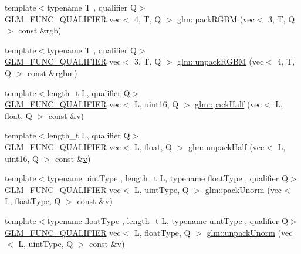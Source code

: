 \begin{DoxyCompactItemize}
\item 
{\footnotesize template$<$typename T , qualifier Q$>$ }\\\mbox{\hyperlink{setup_8hpp_a33fdea6f91c5f834105f7415e2a64407}{G\+L\+M\+\_\+\+F\+U\+N\+C\+\_\+\+Q\+U\+A\+L\+I\+F\+I\+ER}} vec$<$ 4, T, Q $>$ \mbox{\hyperlink{group__gtc__packing_ga0466daf4c90f76cc64b3f105ce727295}{glm\+::pack\+R\+G\+BM}} (vec$<$ 3, T, Q $>$ const \&rgb)
\item 
{\footnotesize template$<$typename T , qualifier Q$>$ }\\\mbox{\hyperlink{setup_8hpp_a33fdea6f91c5f834105f7415e2a64407}{G\+L\+M\+\_\+\+F\+U\+N\+C\+\_\+\+Q\+U\+A\+L\+I\+F\+I\+ER}} vec$<$ 3, T, Q $>$ \mbox{\hyperlink{group__gtc__packing_ga5c1ec97894b05ea21a05aea4f0204a02}{glm\+::unpack\+R\+G\+BM}} (vec$<$ 4, T, Q $>$ const \&rgbm)
\item 
{\footnotesize template$<$length\+\_\+t L, qualifier Q$>$ }\\\mbox{\hyperlink{setup_8hpp_a33fdea6f91c5f834105f7415e2a64407}{G\+L\+M\+\_\+\+F\+U\+N\+C\+\_\+\+Q\+U\+A\+L\+I\+F\+I\+ER}} vec$<$ L, uint16, Q $>$ \mbox{\hyperlink{group__gtc__packing_ga2d8bbce673ebc04831c1fb05c47f5251}{glm\+::pack\+Half}} (vec$<$ L, float, Q $>$ const \&\mbox{\hyperlink{_s_d_l__opengl_8h_a10a82eabcb59d2fcd74acee063775f90}{v}})
\item 
{\footnotesize template$<$length\+\_\+t L, qualifier Q$>$ }\\\mbox{\hyperlink{setup_8hpp_a33fdea6f91c5f834105f7415e2a64407}{G\+L\+M\+\_\+\+F\+U\+N\+C\+\_\+\+Q\+U\+A\+L\+I\+F\+I\+ER}} vec$<$ L, float, Q $>$ \mbox{\hyperlink{group__gtc__packing_ga30d6b2f1806315bcd6047131f547d33b}{glm\+::unpack\+Half}} (vec$<$ L, uint16, Q $>$ const \&\mbox{\hyperlink{_s_d_l__opengl_8h_a10a82eabcb59d2fcd74acee063775f90}{v}})
\item 
{\footnotesize template$<$typename uint\+Type , length\+\_\+t L, typename float\+Type , qualifier Q$>$ }\\\mbox{\hyperlink{setup_8hpp_a33fdea6f91c5f834105f7415e2a64407}{G\+L\+M\+\_\+\+F\+U\+N\+C\+\_\+\+Q\+U\+A\+L\+I\+F\+I\+ER}} vec$<$ L, uint\+Type, Q $>$ \mbox{\hyperlink{group__gtc__packing_gaccd3f27e6ba5163eb7aa9bc8ff96251a}{glm\+::pack\+Unorm}} (vec$<$ L, float\+Type, Q $>$ const \&\mbox{\hyperlink{_s_d_l__opengl_8h_a10a82eabcb59d2fcd74acee063775f90}{v}})
\item 
{\footnotesize template$<$typename float\+Type , length\+\_\+t L, typename uint\+Type , qualifier Q$>$ }\\\mbox{\hyperlink{setup_8hpp_a33fdea6f91c5f834105f7415e2a64407}{G\+L\+M\+\_\+\+F\+U\+N\+C\+\_\+\+Q\+U\+A\+L\+I\+F\+I\+ER}} vec$<$ L, float\+Type, Q $>$ \mbox{\hyperlink{group__gtc__packing_ga3e6ac9178b59f0b1b2f7599f2183eb7f}{glm\+::unpack\+Unorm}} (vec$<$ L, uint\+Type, Q $>$ const \&\mbox{\hyperlink{_s_d_l__opengl_8h_a10a82eabcb59d2fcd74acee063775f90}{v}})

\end{DoxyCompactItemize}
